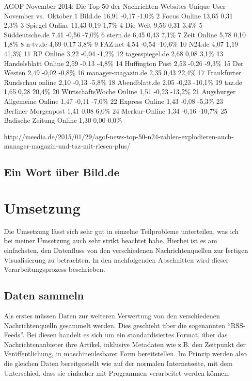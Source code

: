 \documentclass[12pt,ngerman,a4paperpaper,]{paper}
\begin{document}
AGOF November 2014: Die Top 50 der Nachrichten-Websites Unique User
November vs.~Oktober 1 Bild.de 16,91 -0,17 -1,0\% 2 Focus Online 13,65
0,31 2,3\% 3 Spiegel Online 11,43 0,19 1,7\% 4 Die Welt 9,56 0,31 3,4\%
5 Süddeutsche.de 7,41 -0,56 -7,0\% 6 stern.de 6,45 0,43 7,1\% 7 Zeit
Online 5,78 0,10 1,8\% 8 n-tv.de 4,69 0,17 3,8\% 9 FAZ.net 4,54 -0,54
-10,6\% 10 N24.de 4,07 1,19 41,3\% 11 RP Online 3,22 -0,04 -1,2\% 12
tagesspiegel.de 2,68 0,08 3,1\% 13 Handelsblatt Online 2,59 -0,13 -4,8\%
14 Huffington Post 2,53 -0,26 -9,3\% 15 Der Westen 2,49 -0,02 -0,8\% 16
manager-magazin.de 2,35 0,43 22,4\% 17 Frankfurter Rundschau online 2,10
-0,13 -5,8\% 18 Abendblatt.de 2,05 -0,23 -10,1\% 19 taz.de 1,65 0,28
20,4\% 20 WirtschaftsWoche Online 1,51 -0,23 -13,2\% 21 Augsburger
Allgemeine Online 1,47 -0,11 -7,0\% 22 Express Online 1,43 -0,08 -5,3\%
23 Berliner Morgenpost 1,41 0,08 6,0\% 24 Merkur-Online 1,34 -0,16
-10,7\% 25 Badische Zeitung Online 1,30 0,00 0,0\%

http://meedia.de/2015/01/29/agof-news-top-50-n24-zahlen-explodieren-auch-manager-magazin-und-taz-mit-riesen-plus/

\subsection{Ein Wort über Bild.de}\label{ein-wort-uxfcber-bild.de}

\section{Umsetzung}\label{umsetzung}

Die Umsetzung lässt sich sehr gut in einzelne Teilprobleme unterteilen,
was ich bei meiner Umsetzung auch sehr strikt beachtet habe. Hierbei ist
es am einfachsten, den Datenfluss von den verschiedenen
Nachrichtenquellen zur fertigen Visualisierung zu betrachten. In den
nachfolgenden Abschnitten wird dieser Verarbeitungsprozess beschrieben.


\subsection{Daten sammeln}\label{daten-sammeln}

Als erstes müssen Daten zur weiteren Verwertung von den verschiedenen
Nachrichtenquelln gesammelt werden. Dies geschieht über die sogenannten
``RSS-Feeds''. Bei diesen handelt es sich um ein standardisiertes
Format, über das Nachrichtenanbieter ihre Artikel, inklusive Metadaten
wie z.B. den Zeitpunkt der Veröffentlichung, in maschinenlesbarer Form
bereitstellen. Im Prinzip werden also die gleichen Daten bereitgestellt
wie auf der normalen Internetseite, mit dem Unterschied, dass sie
einfacher mit Programmen verarbeitet werden können.
\end{document}
